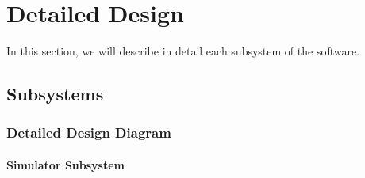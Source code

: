 \documentclass{article}
\begin{document}
\break

\section{Detailed Design} %

In this section, we will describe in detail each subsystem of the software.

\subsection{Subsystems} %

\subsubsection{Detailed Design Diagram} %

\paragraph{Simulator Subsystem} 
\end{document}
